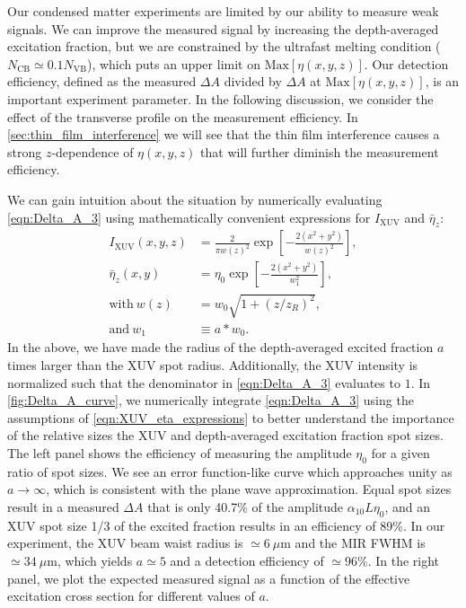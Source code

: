 Our condensed matter experiments are limited by our ability to measure weak signals. We can improve the measured signal by increasing the depth-averaged excitation fraction, but we are constrained by the ultrafast melting condition ($N_{\textrm{CB}} \simeq 0.1 N_{\textrm{VB}}$), which puts an upper limit on $\textrm{Max}[\eta(x,y,z)]$. Our detection efficiency, defined as the measured $\Delta A$ divided by $\Delta A$ at $\textrm{Max}[\eta(x,y,z)]$, is an important experiment parameter. In the following discussion, we consider the effect of the transverse profile on the measurement efficiency. In \cref{sec:thin_film_interference} we will see that the thin film interference causes a strong $z$-dependence of $\eta(x,y,z)$ that will further diminish the measurement efficiency.

We can gain intuition about the situation by numerically evaluating \cref{eqn:Delta_A_3} using mathematically convenient expressions for $I_{\textrm{XUV}}$ and $\bar{\eta}_z$:
\begin{equation}
\begin{aligned}
I_{\textrm{XUV}} (x,y,z) &= \frac{2}{\pi w(z)^2} \exp \left[ - \frac{2 (x^2 + y^2)}{w(z)^2} \right], \\
\bar{\eta}_z(x,y) &= \eta_0 \exp \left[ -\frac{2(x^2 + y^2)}{w_1^2} \right], \\
\textrm{with} \ w(z) &= w_0 \sqrt{1 + (z/z_R)^2}, \\
\textrm{and} \ w_1 &\equiv a*w_0.
\end{aligned}
\label{eqn:XUV_eta_expressions}
\end{equation}
In the above, we have made the radius of the depth-averaged excited fraction $a$ times larger than the XUV spot radius. Additionally, the XUV intensity is normalized such that the denominator in \cref{eqn:Delta_A_3} evaluates to $1$. In \cref{fig:Delta_A_curve}, we numerically integrate \cref{eqn:Delta_A_3} using the assumptions of \cref{eqn:XUV_eta_expressions} to better understand the importance of the relative sizes the XUV and depth-averaged excitation fraction spot sizes. The left panel shows the efficiency of measuring the amplitude $\eta_0$ for a given ratio of spot sizes. We see an error function-like curve which approaches unity as $a \rightarrow \infty$, which is consistent with the plane wave approximation. Equal spot sizes result in a measured $\Delta A$ that is only 40.7\% of the amplitude $\alpha_{10} L \eta_0$, and an XUV spot size 1/3 of the excited fraction results in an efficiency of 89\%. In our experiment, the XUV beam waist radius is $\simeq 6 \ \mu \textrm{m}$ and the MIR FWHM is $\simeq 34 \ \mu \textrm{m}$, which yields $a \simeq 5$ and a detection efficiency of $\simeq 96\%$. In the right panel, we plot the expected measured signal as a function of the effective excitation cross section for different values of $a$.

